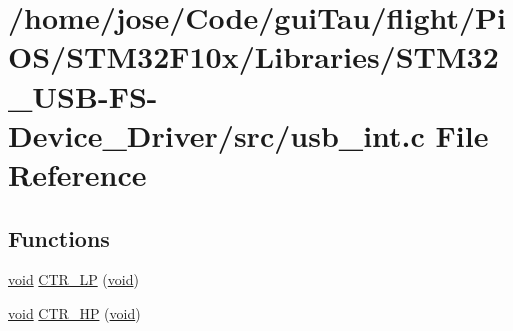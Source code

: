 \hypertarget{_s_t_m32_f10x_2_libraries_2_s_t_m32___u_s_b-_f_s-_device___driver_2src_2usb__int_8c}{\section{/home/jose/\-Code/gui\-Tau/flight/\-Pi\-O\-S/\-S\-T\-M32\-F10x/\-Libraries/\-S\-T\-M32\-\_\-\-U\-S\-B-\/\-F\-S-\/\-Device\-\_\-\-Driver/src/usb\-\_\-int.c File Reference}
\label{_s_t_m32_f10x_2_libraries_2_s_t_m32___u_s_b-_f_s-_device___driver_2src_2usb__int_8c}
}
\subsection*{Functions}
\begin{DoxyCompactItemize}
\item 
\hyperlink{group___n_a_m_e_ga18028b8badbf1ea7e704ccac3c488e82}{void} \hyperlink{_s_t_m32_f10x_2_libraries_2_s_t_m32___u_s_b-_f_s-_device___driver_2src_2usb__int_8c_a54fd7cf2d74fb113dbd2f203568fa083}{C\-T\-R\-\_\-\-L\-P} (\hyperlink{group___n_a_m_e_ga18028b8badbf1ea7e704ccac3c488e82}{void})
\item 
\hyperlink{group___n_a_m_e_ga18028b8badbf1ea7e704ccac3c488e82}{void} \hyperlink{_s_t_m32_f10x_2_libraries_2_s_t_m32___u_s_b-_f_s-_device___driver_2src_2usb__int_8c_a40276e5c399fe32d6c0ef437266693c9}{C\-T\-R\-\_\-\-H\-P} (\hyperlink{group___n_a_m_e_ga18028b8badbf1ea7e704ccac3c488e82}{void})
\end{DoxyCompactItemize}
